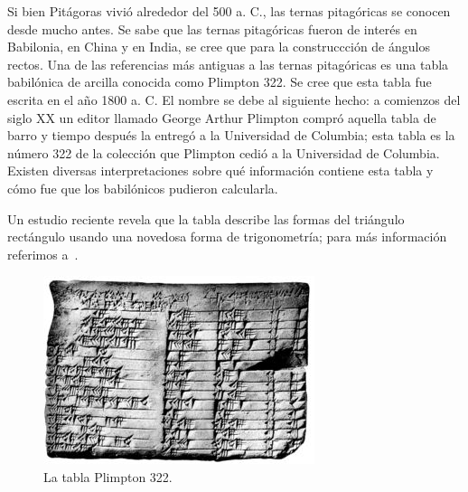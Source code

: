 Si bien Pitágoras vivió alrededor del 500 a. C., las ternas pitagóricas se
conocen desde mucho antes. Se sabe que las ternas pitagóricas fueron de interés
en Babilonia, en China y en India, se cree que para la construccción de ángulos
rectos.  Una de las referencias más antiguas a las ternas pitagóricas es una
tabla babilónica de arcilla conocida como Plimpton 322. Se cree que esta tabla
fue escrita en el año 1800 a. C. El nombre se debe al siguiente hecho: a
comienzos del siglo XX un editor llamado George Arthur Plimpton compró aquella
tabla de barro y tiempo después la entregó a la Universidad de Columbia; esta
tabla es la número 322 de la colección que Plimpton cedió a la Universidad de
Columbia.  Existen diversas interpretaciones sobre qué información contiene
esta tabla y cómo fue que los babilónicos pudieron calcularla. 

%

Un estudio reciente revela que la tabla describe las formas del triángulo
rectángulo usando una novedosa forma de trigonometría; para más información
referimos a~\cite{MR3716328}.

\begin{figure}
   \centering
   \includegraphics[scale=0.8]{images/plimpton322}
   \caption{La tabla Plimpton 322.}
   \label{fig:plimpton}
\end{figure}


